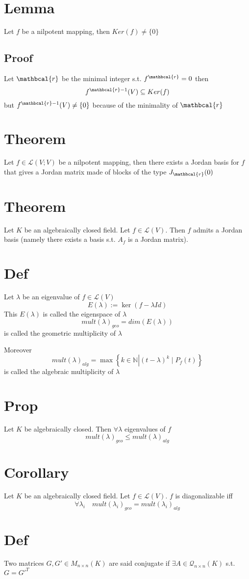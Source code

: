 \documentclass{book}
\begin{document}
\section{Lemma}
Let $f$ be a nilpotent mapping, then $Ker (f)\neq\{0\}$
\subsection*{Proof}
Let $\mathbcal{r}$ be the minimal integer s.t. $f^\mathbcal{r}=0$ then
$$f^{\mathbcal{r}-1}(V)\subseteq Ker(f)$$
but $f^{\mathbcal{r}-1}(V)\neq\{0\}$ because of the minimality of $\mathbcal{r}$
\section{Theorem}
Let $f\in\mathscr{L}(V;V)$ be a nilpotent mapping, then there exists a Jordan basis for $f$ that gives a Jordan matrix made of blocks of the type $J_\mathbcal{r}(0)$
\section{Theorem}
Let $K$ be an algebraically closed field. Let $f\in \mathscr{L}(V)$. Then  $f$ admits a Jordan basis (namely there exists a basis s.t. $A_f$ is a Jordan matrix). 
\section{Def}
Let $\lambda$ be an eigenvalue of $f\in \mathscr{L}(V)$
$$E(\lambda):=\ker (f-\lambda Id)$$
This $E(\lambda)$ is called the eigenspace of $\lambda$
$$mult(\lambda)_{geo}=dim(E(\lambda))$$
is called the geometric multiplicity of $\lambda$

Moreover
$$mult(\lambda)_{alg}=\max\left\{k\in \mathbb{N}\left| (t-\lambda)^k\mid P_f(t)\right.\right\}$$
is called the algebraic multiplicity of $\lambda$
\section{Prop}
Let $K$ be algebraically closed. Then $\forall \lambda$ eigenvalues of $f$
$$mult(\lambda)_{geo}\leq mult(\lambda)_{alg}$$
\section{Corollary}
Let $K$ be an algebraically closed field. Let $f\in \mathscr{L}(V)$. $f$ is diagonalizable iff $$\forall\lambda_i\quad mult(\lambda_i)_{geo}=mult(\lambda_i)_{alg}$$
\section{Def}Two matrices $G,G'\in M_{n\times n}(K)$ are said conjugate if $\exists A\in \mathcal{Q}_{n\times n}(K)$ s.t. $G=G'^T$
\end{document}
